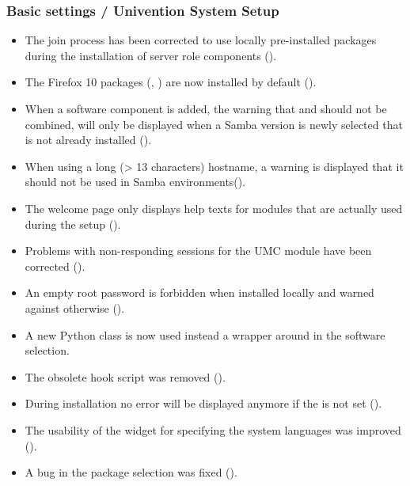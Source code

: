 \subsubsection{Basic settings / Univention System Setup}
\begin{itemize}
\item The join process has been corrected to use locally pre-installed
  packages during the installation of server role components
  ().
\item The Firefox 10 packages (,
  ) are now installed by default ().

\item When a software component is added, the warning that
   and  should not be combined, will
  only be displayed when a Samba version is newly selected that is not
  already installed ().

\item When using a long (> 13 characters) hostname, a warning is displayed
  that it should not be used in Samba environments().

\item The welcome page only displays help texts for modules that are actually
  used during the setup ().

\item Problems with non-responding sessions for the UMC module have
  been corrected ().

\item An empty root password is forbidden when installed locally and
  warned against otherwise ().

\item A new Python class is now used instead a wrapper around
   in the software selection.

\item The obsolete hook script
   was removed
  ().

\item During installation no error will be displayed anymore if the
   is not set ().

\item The usability of the widget for specifying the system languages
  was improved ().

\item A bug in the package selection was fixed ().


\end{itemize}

